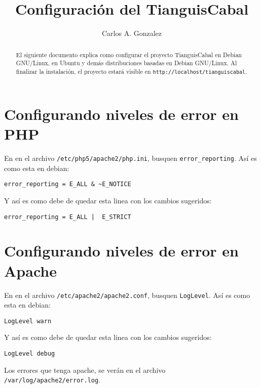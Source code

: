 \documentclass[a4paper,10pt]{article}
\title{Configuración del TianguisCabal}
\author{Carlos A. Gonzalez}
\newenvironment{mylisting}
{\begin{list}{}{\setlength{\leftmargin}{1em}}\item\scriptsize\bfseries}
{\end{list}}
\begin{document}
\maketitle

\begin{abstract}
El siguiente documento explica como configurar el proyecto TianguisCabal en Debian GNU/Linux, en Ubuntu y demás distribuciones basadas en Debian GNU/Linux. Al finalizar la instalación, el proyecto estará visible en \texttt{http://localhost/tianguiscabal}. 
\end{abstract}

\section{Configurando niveles de error en PHP}

En en el archivo \texttt{/etc/php5/apache2/php.ini}, busquen \texttt{error\_reporting}. Así  es como esta en debian:

\begin{mylisting} \begin{verbatim}
error_reporting = E_ALL & ~E_NOTICE
\end{verbatim} \end{mylisting}

Y así es como debe de quedar esta linea con los cambios sugeridos:

\begin{mylisting} \begin{verbatim}
error_reporting = E_ALL |  E_STRICT
\end{verbatim} \end{mylisting}

\section{Configurando niveles de error en Apache}

En en el archivo \texttt{/etc/apache2/apache2.conf}, busquen \texttt{LogLevel}. Así es como esta en debian:

\begin{mylisting} \begin{verbatim}
LogLevel warn
\end{verbatim} \end{mylisting}

Y así es como debe de quedar esta linea con los cambios sugeridos:

\begin{mylisting} \begin{verbatim}
LogLevel debug
\end{verbatim} \end{mylisting}

Los errores que tenga apache, se verán en el archivo \texttt{/var/log/apache2/error.log}.
\end{document}
